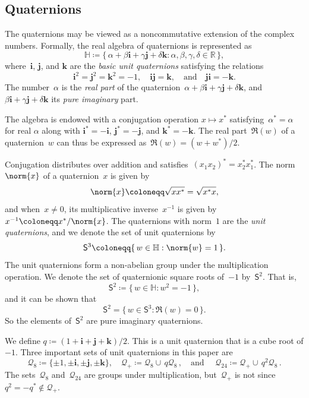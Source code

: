 \documentclass[12pt]{article}
\numberwithin{equation}{section}
\newcommand{\qi}{\mathbf{i}}
\newcommand{\qj}{\mathbf{j}}
\newcommand{\qk}{\mathbf{k}}
\newcommand{\HH}{\mathbb{H}}
\newcommand{\Q}{\mathcal{Q}}
\newcommand{\reals}{{\mathbb R}}
\newcommand{\eqdef}{\coloneqq}
\newcommand{\eq}{=}
\newcommand{\qsphere}{{\mathsf S}}
\begin{document}
\subsection{Quaternions}\label{sec:quat}

The quaternions may be viewed as a noncommutative extension of the complex numbers. 
Formally, the real algebra of quaternions is represented as
\begin{equation*}
\HH \eqdef \{\, \alpha + \beta \qi + \gamma \qj + \delta \qk : \alpha, \beta, \gamma, \delta \in \reals \,\} ,
\end{equation*}
where~$\qi$, $\qj$, and $\qk$ are the \emph{basic unit quaternions\/} satisfying the relations 
\[
\qi^2 = \qj^2 = \qk^2 = -1, \quad \qi \qj = \qk, \quad\text{and}\quad \qj \qi = -\qk .
\]
The number~$\alpha$ is the \emph{real part\/} of the quaternion~$\alpha + \beta \qi + \gamma \qj + \delta \qk$, and~$\beta \qi + \gamma \qj + \delta \qk$ its \emph{pure imaginary\/} part.

The algebra is endowed with a conjugation operation $x\mapsto x^*$ satisfying~$\alpha^\ast = \alpha$ for real $\alpha$
along with $\qi^\ast = -\qi$, $\qj^\ast = -\qj$, and  $\qk^\ast = -\qk$. The real part~$\Re(w)$ of a quaternion~$w$ can thus be expressed as~$\Re(w) = (w + w^*)/2$. 

Conjugation distributes over addition and satisfies~$(x_1 x_2)^\ast = x_2^\ast x_1^\ast$.
The norm~$\norm{x}$ of a quaternion~$x$ is given by
\[
\norm{x} \eqdef \sqrt{x x^\ast} \eq \sqrt{x^\ast x} , 
\]
and when~$x \neq 0$, its multiplicative inverse~$x^{-1}$ is given by~$x^{-1} \eqdef x^\ast / \norm{x}$.
The quaternions with norm~$1$ are the \emph{unit quaternions\/}, and we denote the set of unit quaternions by
\[
\qsphere^3 \eqdef \{\, w \in \HH : \norm{w} = 1 \,\} .
\]
The unit quaternions form a non-abelian group under the multiplication operation.
We denote the set of quaternionic square roots of~$-1$ by~$\qsphere^2$. That is,
\[
\qsphere^2 \eqdef \{\, w \in \HH : w^2=-1 \,\} ,
\]
and it can be shown that 
\[
\qsphere^2 \eq \{\, w \in \qsphere^3 : \Re(w)=0 \,\} . 
\]
So the elements of~$\qsphere^2$ are pure imaginary quaternions.

We define $q \eqdef (1+\qi+\qj+\qk)/2$. This is a unit quaternion that is a cube root of $-1$.
Three important sets of unit quaternions in this paper are
\[
\Q_8 \eqdef \{\pm1,\pm\qi, \pm\qj, \pm\qk\}, \quad \Q_+ \eqdef \Q_8 \cup \, q\Q_8 \,, \quad \text{and }  \quad \Q_{24} \eqdef \Q_+\cup \, q^2\Q_8 \,.
\]
The sets~$\Q_8$ and~$\Q_{24}$ are groups under multiplication, but~$\Q_+$ is not since $q^2=-q^*\notin\Q_+$.
\end{document}

